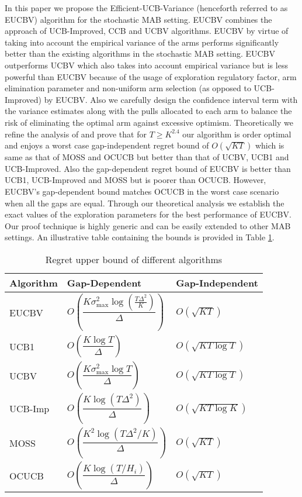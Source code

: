 In this paper we propose the Efficient-UCB-Variance (henceforth referred to as EUCBV) algorithm for the stochastic MAB setting. EUCBV combines the approach of UCB-Improved, CCB \citep{liu2016modification} and UCBV algorithms. EUCBV by virtue of taking into account the empirical variance of the arms performs significantly better than the existing algorithms in the stochastic MAB setting. EUCBV outperforms UCBV \citep{audibert2009exploration} which also takes into account empirical variance but is less powerful than EUCBV because of the usage of exploration regulatory factor, arm elimination parameter and non-uniform arm selection (as opposed to UCB-Improved) by EUCBV. Also we carefully design the confidence interval term with the variance estimates along with the pulls allocated to each arm to balance the risk of eliminating the optimal arm against excessive optimism.   Theoretically we refine the analysis of \citet{auer2010ucb} and prove that for $T\geq K^{2.4}$ our algorithm is order optimal and enjoys a worst case gap-independent regret bound of $O\left( \sqrt{KT} \right)$ which is same as that of MOSS and OCUCB but better than that of UCBV, UCB1 and UCB-Improved. Also the gap-dependent regret bound of EUCBV is better than UCB1, UCB-Improved and MOSS but is poorer than OCUCB. However, EUCBV's gap-dependent bound matches OCUCB in the worst case scenario when all the gaps are equal. Through our theoretical analysis we establish the exact values of the exploration parameters for the best performance of EUCBV. Our proof technique is highly generic and can be easily extended to other MAB settings. An illustrative table containing the bounds is provided in Table \ref{tab:comp-bds}. 


\begin{table}[t]
\caption{Regret upper bound of different algorithms}
\label{tab:comp-bds}
\begin{center}
\begin{tabular}{p{3em}p{9em}p{7em}}
\toprule
Algorithm  &   \hspace*{1mm}Gap-Dependent & Gap-Independent \\
\hline
EUCBV		& $O\left( \dfrac{K\sigma_{\max}^{2}\log (\frac{T\Delta^2}{K})}{\Delta}\right)$ & $O\left(\sqrt{KT}\right)$\\
UCB1        & $O\left( \dfrac{K\log T}{\Delta} \right)$ & $O\left(\sqrt{KT\log T}\right)$ \\%
UCBV        & $O\left( \dfrac{K\sigma_{\max}^{2}\log T}{\Delta} \right)$ & $O\left(\sqrt{KT\log T}\right)$ \\
UCB-Imp 		& $O\left( \dfrac{K\log (T\Delta^2)}{\Delta} \right)$ & $O\left(\sqrt{KT\log K}\right)$ \\%
MOSS	     	& $O\left( \dfrac{K^2\log (T\Delta^2 /K)}{\Delta}\right)$ & $O\left(\sqrt{KT}\right)$\\%
OCUCB     	& $O\left( \dfrac{K\log (T/ H_{i})}{\Delta}\right)$ & $O\left(\sqrt{KT}\right)$\\\midrule
\end{tabular}
\end{center}
\vspace*{-2em}
\end{table}


